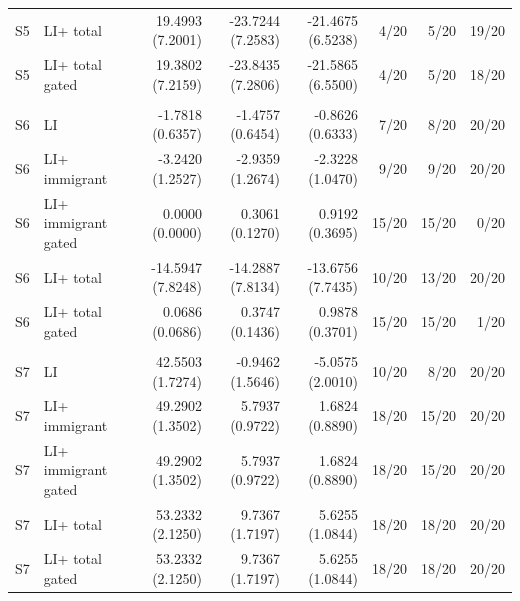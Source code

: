 \begin{table}[H]
\begin{tabular}{@{}llrrrrrr@{}}
S5 & LI+ total & 19.4993 (7.2001) & -23.7244 (7.2583) & -21.4675 (6.5238) & 4/20 & 5/20 & 19/20\\
S5 & LI+ total gated & 19.3802 (7.2159) & -23.8435 (7.2806) & -21.5865 (6.5500) & 4/20 & 5/20 & 18/20\\
\addlinespace
\multicolumn{8}{@{}l}{\textbf{S6}: mean $N_{\mathrm{train}}=95.80$, $N_{\mathrm{test}}=111.55$} \\
S6 & LI & -1.7818 (0.6357) & -1.4757 (0.6454) & -0.8626 (0.6333) & 7/20 & 8/20 & 20/20\\
S6 & LI+ immigrant & -3.2420 (1.2527) & -2.9359 (1.2674) & -2.3228 (1.0470) & 9/20 & 9/20 & 20/20\\
S6 & LI+ immigrant gated & 0.0000 (0.0000) & 0.3061 (0.1270) & 0.9192 (0.3695) & 15/20 & 15/20 & 0/20\\
S6 & LI+ total & -14.5947 (7.8248) & -14.2887 (7.8134) & -13.6756 (7.7435) & 10/20 & 13/20 & 20/20\\
S6 & LI+ total gated & 0.0686 (0.0686) & 0.3747 (0.1436) & 0.9878 (0.3701) & 15/20 & 15/20 & 1/20\\
\addlinespace
\multicolumn{8}{@{}l}{\textbf{S7}: mean $N_{\mathrm{train}}=13.30$, $N_{\mathrm{test}}=13.25$} \\
S7 & LI & 42.5503 (1.7274) & -0.9462 (1.5646) & -5.0575 (2.0010) & 10/20 & 8/20 & 20/20\\
S7 & LI+ immigrant & 49.2902 (1.3502) & 5.7937 (0.9722) & 1.6824 (0.8890) & 18/20 & 15/20 & 20/20\\
S7 & LI+ immigrant gated & 49.2902 (1.3502) & 5.7937 (0.9722) & 1.6824 (0.8890) & 18/20 & 15/20 & 20/20\\
S7 & LI+ total & 53.2332 (2.1250) & 9.7367 (1.7197) & 5.6255 (1.0844) & 18/20 & 18/20 & 20/20\\
S7 & LI+ total gated & 53.2332 (2.1250) & 9.7367 (1.7197) & 5.6255 (1.0844) & 18/20 & 18/20 & 20/20\\
\bottomrule\end{tabular}\end{table}

